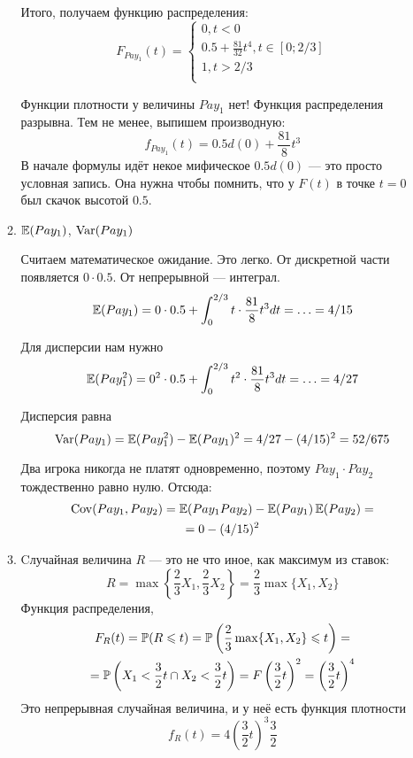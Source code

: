 \begin{enumerate}
\begin{enumerate}
Итого, получаем функцию распределения:
\begin{equation}
F_{Pay_{1}}(t)=
\begin{cases}
0, t<0 \\
0.5+\frac{81}{32}t^{4}, t\in [0;2/3] \\
1, t>2/3 \\
\end{cases}
\end{equation}

Функции плотности у величины $ Pay_{1} $ нет! Функция распределения разрывна. Тем не менее, выпишем производную:
\begin{equation}
f_{Pay_{1}}(t)=0.5d(0)+\frac{81}{8}t^{3}
\end{equation}
В начале формулы идёт некое мифическое $ 0.5d(0) $ — это просто условная запись. Она нужна чтобы помнить, что у  $ F(t) $ в точке $ t=0 $ был скачок высотой $ 0.5 $.


\item $ \E(Pay_{1}) $, $\Var(Pay_{1}) $

Считаем математическое ожидание. Это легко. От дискретной части появляется $ 0\cdot 0.5 $. От непрерывной — интеграл.
\begin{equation}
\E(Pay_{1})=0\cdot 0.5+\int_{0}^{2/3}t\cdot \frac{81}{8}t^{3} dt=\ldots=4/15
\end{equation}

Для дисперсии нам нужно
\begin{equation}
\E(Pay_{1}^{2})=0^{2}\cdot 0.5+\int_{0}^{2/3}t^{2}\cdot \frac{81}{8}t^{3} dt=\ldots=4/27
\end{equation}

Дисперсия равна
\begin{equation}
\Var(Pay_{1})=\E(Pay_{1}^{2})-\E(Pay_{1})^{2}=4/27-(4/15)^{2}=52/675
\end{equation}


Два игрока никогда не платят одновременно, поэтому $ Pay_{1}\cdot Pay_{2} $ тождественно равно нулю. Отсюда:
\begin{multline}
\Cov(Pay_{1},Pay_{2})=\E(Pay_{1}Pay_{2})-\E(Pay_{1})\E(Pay_{2})=\\
=0-(4/15)^{2}
\end{multline}
\item Cлучайная величина $ R$ — это не что иное, как максимум из ставок:
\begin{equation}
R=\max\left\{ \frac{2}{3}X_{1},\frac{2}{3}X_{2} \right\}=\frac{2}{3}\max\{X_{1},X_{2}\}
\end{equation}
Функция распределения,
\begin{multline}
F_{R}(t)=\P(R\leq t)=\P\left(\frac{2}{3}\max\{X_{1},X_{2}\}\leq t\right)=\\
=\P\left(X_{1}<\frac{3}{2}t \cap X_{2}<\frac{3}{2}t\right)=F\left(\frac{3}{2}t\right)^{2}=\left(\frac{3}{2}t\right)^{4}
\end{multline}
Это непрерывная случайная величина, и у неё есть функция плотности
\begin{equation}
f_{R}(t)=4\left(\frac{3}{2}t\right)^{3}\frac{3}{2}
\end{equation}


\end{enumerate}
\end{enumerate}
